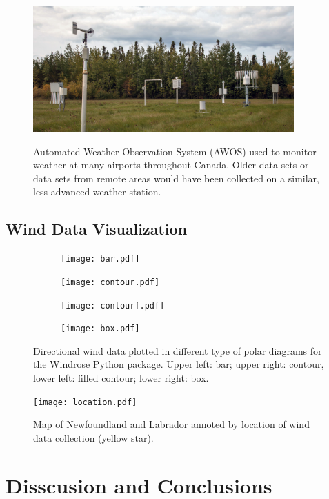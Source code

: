 \documentclass{article}
\begin{document}
\begin{figure}[h!]
\centering
\includegraphics[width=10cm]{Images/AWOS.jpg}
\label{AWOS}
\caption{Automated Weather Observation System (AWOS) used to monitor weather at many airports throughout Canada. Older data sets or data sets from remote areas would have been collected on a similar, 
less-advanced weather station.}
\end{figure}

\subsection{Wind Data Visualization}\label{Wind_data_visualization}

\begin{figure}[h!]
\begin{subfigure}{.55\textwidth}
\centering
\texttt{[image: bar.pdf]}
\label{bar_windrose}
\end{subfigure}
\begin{subfigure}{.55\textwidth}
\centering
\texttt{[image: contour.pdf]}
\label{contour}
\end{subfigure}
\begin{subfigure}{.55\textwidth}
\centering
\texttt{[image: contourf.pdf]}
\label{contourf_windrose}
\end{subfigure}
\begin{subfigure}{.55\textwidth}
\centering
\texttt{[image: box.pdf]}
\label{box_windrose}
\end{subfigure}
\label{windrose_diagrams}
\caption{Directional wind data plotted in different type of polar diagrams for the Windrose Python package. Upper left: bar; upper right: contour, lower left: filled contour; lower right: box.}
\end{figure}

\begin{figure}[h!]
\centering
\texttt{[image: location.pdf]}
\label{location}
\caption{Map of Newfoundland and Labrador annoted by location of wind data collection (yellow star).}
\end{figure}

\section{Disscusion and Conclusions}\label{Disscusion_and_conclusions}
\end{document}
